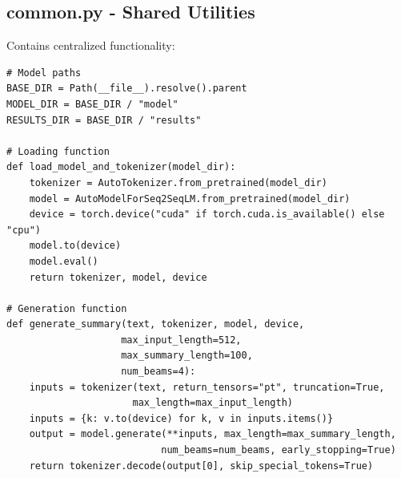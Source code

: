 \documentclass[12pt,a4paper,oneside]{report}
\begin{document}
\subsection{common.py - Shared Utilities}
Contains centralized functionality:
\begin{lstlisting}
# Model paths
BASE_DIR = Path(__file__).resolve().parent
MODEL_DIR = BASE_DIR / "model"
RESULTS_DIR = BASE_DIR / "results"

# Loading function
def load_model_and_tokenizer(model_dir):
    tokenizer = AutoTokenizer.from_pretrained(model_dir)
    model = AutoModelForSeq2SeqLM.from_pretrained(model_dir)
    device = torch.device("cuda" if torch.cuda.is_available() else "cpu")
    model.to(device)
    model.eval()
    return tokenizer, model, device

# Generation function
def generate_summary(text, tokenizer, model, device,
                    max_input_length=512,
                    max_summary_length=100,
                    num_beams=4):
    inputs = tokenizer(text, return_tensors="pt", truncation=True,
                      max_length=max_input_length)
    inputs = {k: v.to(device) for k, v in inputs.items()}
    output = model.generate(**inputs, max_length=max_summary_length,
                           num_beams=num_beams, early_stopping=True)
    return tokenizer.decode(output[0], skip_special_tokens=True)
\end{lstlisting}
\end{document}

